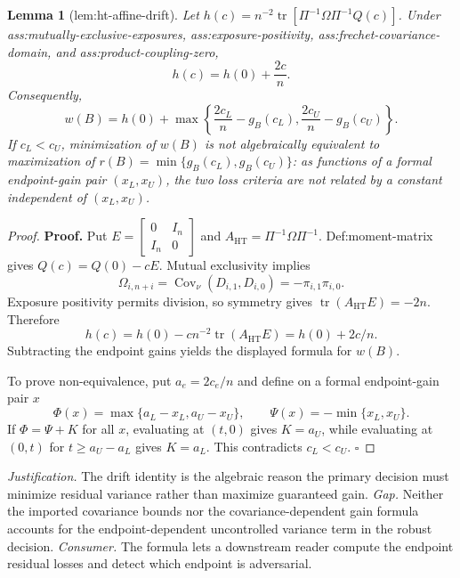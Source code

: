 \documentclass{article}
\newtheorem{lemma}{Lemma}
\begin{document}
\begin{lemma}[lem:ht-affine-drift]\label{lem:ht-affine-drift}
Let \(h(c)=n^{-2}\operatorname{tr}[\Pi^{-1}\Omega\Pi^{-1}Q(c)]\).  Under ass:mutually-exclusive-exposures, ass:exposure-positivity, ass:frechet-covariance-domain, and ass:product-coupling-zero,
\[
h(c)=h(0)+\frac{2c}{n}.
\]
Consequently,
\[
w(B)=h(0)+\max\left\{\frac{2c_L}{n}-g_B(c_L),\frac{2c_U}{n}-g_B(c_U)\right\}.
\]
If \(c_L<c_U\), minimization of \(w(B)\) is not algebraically equivalent to maximization of \(r(B)=\min\{g_B(c_L),g_B(c_U)\}\): as functions of a formal endpoint-gain pair \((x_L,x_U)\), the two loss criteria are not related by a constant independent of \((x_L,x_U)\).
\end{lemma}
\begin{proof}
\textbf{Proof.}
Put \(E=\begin{bmatrix}0&I_n\\I_n&0\end{bmatrix}\) and \(A_{\mathrm{HT}}=\Pi^{-1}\Omega\Pi^{-1}\).  Def:moment-matrix gives \(Q(c)=Q(0)-cE\).  Mutual exclusivity implies
\[
\Omega_{i,n+i}=\operatorname{Cov}_\nu(D_{i,1},D_{i,0})
=-\pi_{i,1}\pi_{i,0}.
\]
Exposure positivity permits division, so symmetry gives \(\operatorname{tr}(A_{\mathrm{HT}}E)=-2n\).  Therefore
\[
h(c)=h(0)-cn^{-2}\operatorname{tr}(A_{\mathrm{HT}}E)
=h(0)+2c/n.
\]
Subtracting the endpoint gains yields the displayed formula for \(w(B)\).

To prove non-equivalence, put \(a_e=2c_e/n\) and define on a formal endpoint-gain pair \(x\)
\[
\Phi(x)=\max\{a_L-x_L,a_U-x_U\},
\qquad \Psi(x)=-\min\{x_L,x_U\}.
\]
If \(\Phi=\Psi+K\) for all \(x\), evaluating at \((t,0)\) gives \(K=a_U\), while evaluating at \((0,t)\) for \(t\ge a_U-a_L\) gives \(K=a_L\).  This contradicts \(c_L<c_U\). \(\square\)
\end{proof}
\par\smallskip\noindent \textit{Justification.} The drift identity is the algebraic reason the primary decision must minimize residual variance rather than maximize guaranteed gain. \textit{Gap.} Neither the imported covariance bounds nor the covariance-dependent gain formula accounts for the endpoint-dependent uncontrolled variance term in the robust decision. \textit{Consumer.} The formula lets a downstream reader compute the endpoint residual losses and detect which endpoint is adversarial.
\end{document}
